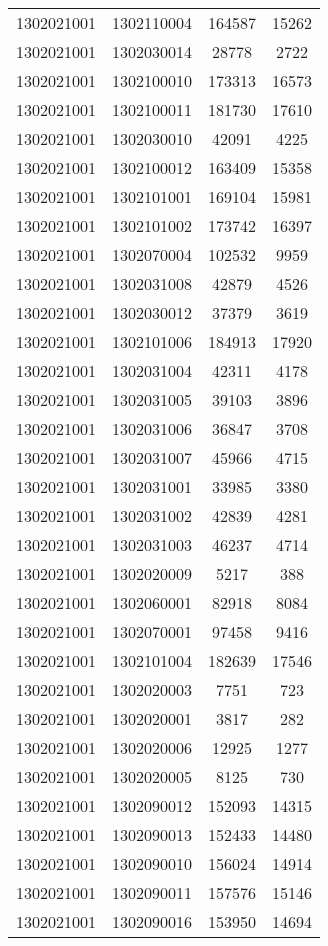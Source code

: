 \begin{longtable}{llcc}
1302021001 & 1302110004 & 164587 & 15262\\
1302021001 & 1302030014 & 28778 & 2722\\
1302021001 & 1302100010 & 173313 & 16573\\
1302021001 & 1302100011 & 181730 & 17610\\
1302021001 & 1302030010 & 42091 & 4225\\
1302021001 & 1302100012 & 163409 & 15358\\
1302021001 & 1302101001 & 169104 & 15981\\
1302021001 & 1302101002 & 173742 & 16397\\
1302021001 & 1302070004 & 102532 & 9959\\
1302021001 & 1302031008 & 42879 & 4526\\
1302021001 & 1302030012 & 37379 & 3619\\
1302021001 & 1302101006 & 184913 & 17920\\
1302021001 & 1302031004 & 42311 & 4178\\
1302021001 & 1302031005 & 39103 & 3896\\
1302021001 & 1302031006 & 36847 & 3708\\
1302021001 & 1302031007 & 45966 & 4715\\
1302021001 & 1302031001 & 33985 & 3380\\
1302021001 & 1302031002 & 42839 & 4281\\
1302021001 & 1302031003 & 46237 & 4714\\
1302021001 & 1302020009 & 5217 & 388\\
1302021001 & 1302060001 & 82918 & 8084\\
1302021001 & 1302070001 & 97458 & 9416\\
1302021001 & 1302101004 & 182639 & 17546\\
1302021001 & 1302020003 & 7751 & 723\\
1302021001 & 1302020001 & 3817 & 282\\
1302021001 & 1302020006 & 12925 & 1277\\
1302021001 & 1302020005 & 8125 & 730\\
1302021001 & 1302090012 & 152093 & 14315\\
1302021001 & 1302090013 & 152433 & 14480\\
1302021001 & 1302090010 & 156024 & 14914\\
1302021001 & 1302090011 & 157576 & 15146\\
1302021001 & 1302090016 & 153950 & 14694\\

\end{longtable}
